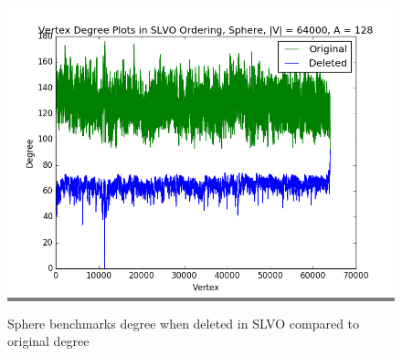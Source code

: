 \documentclass{article}
\begin{document}
\begin{figure}
\begin{minipage}{0.45\textwidth}
    \colorbox{gray}{\includegraphics[width=\linewidth]{./graphs/hist_deg_del_sphere_2.png}}
    \end{minipage}

    \caption{Sphere benchmarks degree when deleted in SLVO compared to original degree}
    \label{spheredegdelhists}
\end{figure}
\end{document}
